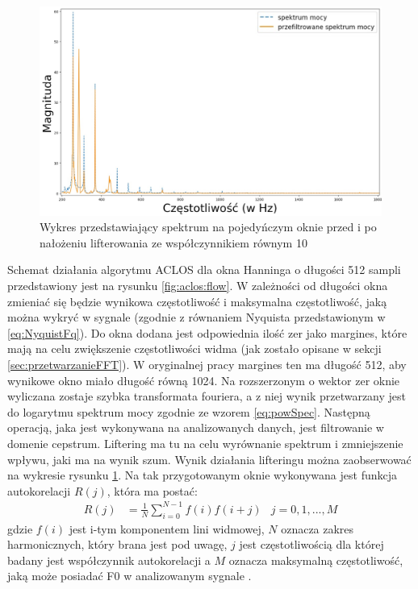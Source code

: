 \documentclass[12pt,a4paper,twoside]{mwart}
\begin{document}
\begin{figure}[h]
  \begin{center}
    \includegraphics[scale=0.33]{images/ACLOS/data_lifter_cropped.jpg} 
    \caption{Wykres przedstawiający spektrum na pojedyńczym oknie przed i po nałożeniu lifterowania ze współczynnikiem równym 10} 
    \label{fig:aclos:lifter}
  \end{center}
\end{figure}

Schemat działania algorytmu ACLOS dla okna Hanninga o długości 512 sampli przedstawiony jest na rysunku \ref{fig:aclos:flow}. W zależności od długości okna zmieniać się będzie wynikowa częstotliwość i maksymalna częstotliwość, jaką można wykryć w sygnale (zgodnie z równaniem Nyquista przedstawionym w \ref{eq:NyquistFq}). Do okna dodana jest odpowiednia ilość zer jako margines, które mają na celu zwiększenie częstotliwości widma (jak zostało opisane w sekcji \ref{sec:przetwarzanieFFT}). W oryginalnej pracy margines ten ma długość 512, aby wynikowe okno miało długość równą 1024. Na rozszerzonym o wektor zer oknie wyliczana zostaje szybka transformata fouriera, a z niej wynik przetwarzany jest do logarytmu spektrum mocy zgodnie ze wzorem \ref{eq:powSpec}. Następną operacją, jaka jest wykonywana na analizowanych danych, jest filtrowanie w domenie cepstrum. Liftering ma tu na celu wyrównanie spektrum i zmniejszenie wpływu, jaki ma na wynik szum. Wynik działania lifteringu można zaobserwować na wykresie rysunku \ref{fig:aclos:lifter}. Na tak przygotowanym oknie wykonywana jest funkcja autokorelacji $R(j)$, która ma postać:
\begin{align}\label{eq:Aclos:ACf}
  R(j)& = \frac{1}{N}\sum_{i=0}^{N-1}f(i)f(i + j)&
  j = 0, 1, ..., M
\end{align}
gdzie $f(i)$ jest i-tym komponentem lini widmowej, $N$ oznacza zakres harmonicznych, który brana jest pod uwagę, $j$ jest częstotliwością dla której badany jest współczynnik autokorelacji a $M$ oznacza maksymalną częstotliwość, jaką może posiadać F0 w analizowanym sygnale \cite[50-51]{Transcription:Quenneville:Thesis}.
\end{document}
